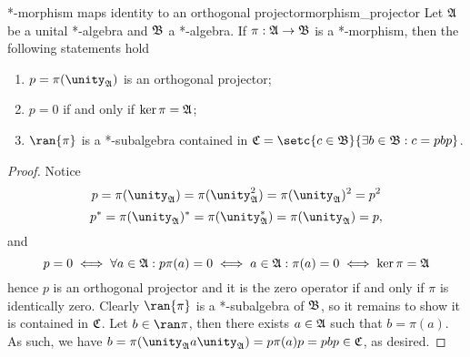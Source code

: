 \begin{lemma}{*-morphism maps identity to an orthogonal projector}{morphism_projector}
    Let \(\mathfrak{A}\) be a unital *-algebra and \(\mathfrak{B}\) a *-algebra. If \(\pi : \mathfrak{A} \to \mathfrak{B}\) is a *-morphism, then the following statements hold
    \begin{enumerate}[label=(\alph*)]
        \item \(p = \pi(\unity_{\algebra{A}})\) is an orthogonal projector;
        \item \(p = 0\) if and only if \(\ker{\pi} = \mathfrak{A}\);
        \item \(\ran{\pi}\) is a *-subalgebra contained in \(\algebra{C} = \setc{c \in \algebra{B}}{\exists b \in \algebra{B} : c = pbp}\).
    \end{enumerate}
\end{lemma}
\begin{proof}
    Notice
    \begin{equation*}
        p = \pi(\unity_\algebra{A}) = \pi(\unity_\algebra{A}^2) = \pi(\unity_\algebra{A})^2 = p^2
    \end{equation*}
    \begin{equation*}
        p^* = \pi(\unity_\algebra{A})^* = \pi(\unity_\algebra{A}^*) = \pi(\unity_\algebra{A}) = p,
    \end{equation*}
    and
    \begin{equation*}
        p = 0 \iff \forall a \in \mathfrak{A}: p \pi(a) = 0 \iff a \in \mathfrak{A} : \pi(a) = 0 \iff \ker{\pi} = \mathfrak{A}
    \end{equation*}
    hence \(p\) is an orthogonal projector and it is the zero operator if and only if \(\pi\) is identically zero. Clearly \(\ran{\pi}\) is a *-subalgebra of \(\mathfrak{B}\), so it remains to show it is contained in \(\mathfrak{C}\). Let \(b \in \ran\pi\), then there exists \(a \in \mathfrak{A}\) such that \(b = \pi(a)\). As such, we have \(b = \pi(\unity_{\algebra{A}} a \unity_{\algebra{A}}) = p\pi(a)p = pbp \in \algebra{C}\), as desired.
\end{proof}

